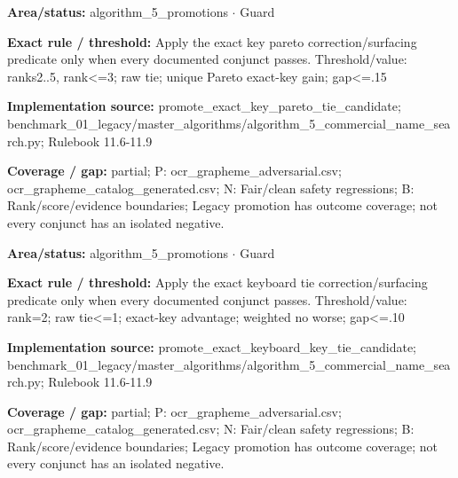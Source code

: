 \begin{tcolorbox}[enhanced,breakable,colback=white,colframe=Muted!45,boxrule=0.45pt,arc=1.5pt,left=6pt,right=6pt,top=5pt,bottom=5pt,title={\texttt{A5-PROMOTE-EXACT-KEY-PARETO}},title after break={\texttt{A5-PROMOTE-EXACT-KEY-PARETO}\ (continued)},fonttitle=\headingfont\bfseries\color{Navy},coltitle=Navy]
\textbf{Area/status:} algorithm\_\allowbreak{}5\_\allowbreak{}promotions $\boldsymbol{\cdot}$ Guard\par
\smallskip
\textbf{Exact rule / threshold:} Apply the exact key pareto correction/\allowbreak{}surfacing predicate only when every documented conjunct passes. Threshold/\allowbreak{}value: ranks2..5, rank<=3; raw tie; unique Pareto exact-key gain; gap<=.15\par
\smallskip
\textbf{Implementation source:} promote\_\allowbreak{}exact\_\allowbreak{}key\_\allowbreak{}pareto\_\allowbreak{}tie\_\allowbreak{}candidate; benchmark\_\allowbreak{}01\_\allowbreak{}legacy/\allowbreak{}master\_\allowbreak{}algorithms/\allowbreak{}algorithm\_\allowbreak{}5\_\allowbreak{}commercial\_\allowbreak{}name\_\allowbreak{}search.py; Rulebook 11.6-11.9\par
\smallskip
\textbf{Coverage / gap:} partial; P: ocr\_\allowbreak{}grapheme\_\allowbreak{}adversarial.csv; ocr\_\allowbreak{}grapheme\_\allowbreak{}catalog\_\allowbreak{}generated.csv; N: Fair/\allowbreak{}clean safety regressions; B: Rank/\allowbreak{}score/\allowbreak{}evidence boundaries; Legacy promotion has outcome coverage; not every conjunct has an isolated negative.
\end{tcolorbox}
\begin{tcolorbox}[enhanced,breakable,colback=white,colframe=Muted!45,boxrule=0.45pt,arc=1.5pt,left=6pt,right=6pt,top=5pt,bottom=5pt,title={\texttt{A5-PROMOTE-EXACT-KEYBOARD-TIE}},title after break={\texttt{A5-PROMOTE-EXACT-KEYBOARD-TIE}\ (continued)},fonttitle=\headingfont\bfseries\color{Navy},coltitle=Navy]
\textbf{Area/status:} algorithm\_\allowbreak{}5\_\allowbreak{}promotions $\boldsymbol{\cdot}$ Guard\par
\smallskip
\textbf{Exact rule / threshold:} Apply the exact keyboard tie correction/\allowbreak{}surfacing predicate only when every documented conjunct passes. Threshold/\allowbreak{}value: rank=2; raw tie<=1; exact-key advantage; weighted no worse; gap<=.10\par
\smallskip
\textbf{Implementation source:} promote\_\allowbreak{}exact\_\allowbreak{}keyboard\_\allowbreak{}key\_\allowbreak{}tie\_\allowbreak{}candidate; benchmark\_\allowbreak{}01\_\allowbreak{}legacy/\allowbreak{}master\_\allowbreak{}algorithms/\allowbreak{}algorithm\_\allowbreak{}5\_\allowbreak{}commercial\_\allowbreak{}name\_\allowbreak{}search.py; Rulebook 11.6-11.9\par
\smallskip
\textbf{Coverage / gap:} partial; P: ocr\_\allowbreak{}grapheme\_\allowbreak{}adversarial.csv; ocr\_\allowbreak{}grapheme\_\allowbreak{}catalog\_\allowbreak{}generated.csv; N: Fair/\allowbreak{}clean safety regressions; B: Rank/\allowbreak{}score/\allowbreak{}evidence boundaries; Legacy promotion has outcome coverage; not every conjunct has an isolated negative.
\end{tcolorbox}
